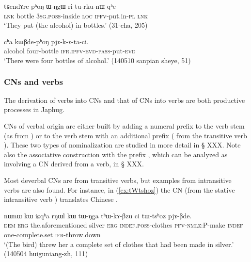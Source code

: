 \begin{exe}
\ex \label{ex:phoN}
\gll  tɕendɤre pʰoŋ ɯ-ŋgɯ ri tu-rku-nɯ qʰe \\
\textsc{lnk} bottle \textsc{3sg}.\textsc{poss}-inside \textsc{loc} \textsc{ipfv}-put.in-\textsc{pl} \textsc{lnk} \\
\glt `They put (the alcohol) in bottles.' (31-cha, 205)
\end{exe}

\begin{exe}
\ex \label{ex:kWBdephoN}
\gll cʰa kɯβde-pʰoŋ pjɤ-k-ɤ-ta-ci. \\
alcohol four-bottle \textsc{ifr}.\textsc{ipfv}-\textsc{evd}-\textsc{pass}-put-\textsc{evd} \\
\glt  `There were four bottles of alcohol.' (140510 sanpian sheye, 51)
\end{exe}
\subsubsection{CNs and verbs}   \label{sec:CN.verbs}
The derivation of verbs into CNs and that of CNs into verbs are both productive processes in Japhug. 

CNs of verbal origin are either built by adding a numeral prefix to the verb stem (as  from ) or to the verb stem with an additional prefix  ( from the transitive verb ). These two types of nominalization are studied in more detail in § XXX. Note also the associative  construction with the prefix , which can be analyzed as involving a CN derived from a verb, in § XXX. %

Most deverbal CNs are from transitive verbs, but examples from intransitive verbs are also found. For instance, in (\ref{ex:tWtshoz}) the CN  (from the stative intransitive verb ) translates Chinese .

\begin{exe}
\ex \label{ex:tWtshoz}
\gll nɯnɯ kɯ iɕqʰa rŋɯl kɯ tɯ-ŋga tʰɯ-kɤ-βzu ci tɯ-tsʰoz pjɤ-βde. \\
\textsc{dem} \textsc{erg} the.aforementioned silver \textsc{erg} \textsc{indef}.\textsc{poss}-clothes \textsc{pfv}-\textsc{nmlz}:P-make \textsc{indef} one-complete.set \textsc{ifr}-throw.down \\
\glt `(The bird) threw her a complete set of clothes that had been made in silver.'  (140504 huiguniang-zh, 111)
\end{exe}


